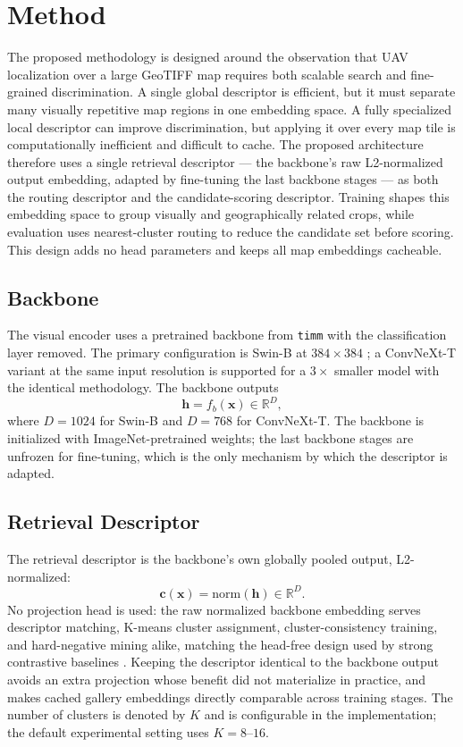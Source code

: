 \documentclass[conference]{IEEEtran}
\begin{document}
\section{Method}
The proposed methodology is designed around the observation that UAV
localization over a large GeoTIFF map requires both scalable search and
fine-grained discrimination. A single global descriptor is efficient, but it
must separate many visually repetitive map regions in one embedding space. A
fully specialized local descriptor can improve discrimination, but applying it
over every map tile is computationally inefficient and difficult to cache. The
proposed architecture therefore uses a single retrieval descriptor — the
backbone's raw L2-normalized output embedding, adapted by fine-tuning the
last backbone stages — as both
the routing descriptor and the candidate-scoring descriptor. Training shapes
this embedding space to group visually and geographically
related crops, while evaluation uses nearest-cluster routing to reduce the
candidate set before scoring. This design adds no head parameters and keeps
all map embeddings cacheable.

\subsection{Backbone}
The visual encoder uses a pretrained backbone from \texttt{timm}
with the classification layer removed. The primary configuration is Swin-B at
$384\times384$ \cite{liu2021swin}; a ConvNeXt-T variant at the same input
resolution is supported for a $3\times$ smaller model with the identical
methodology. The backbone outputs
\begin{equation}
    \mathbf{h}=f_b(\mathbf{x})\in\mathbb{R}^{D},
\end{equation}
where $D=1024$ for Swin-B and $D=768$ for ConvNeXt-T. The backbone is
initialized with ImageNet-pretrained weights; the last backbone stages are
unfrozen for fine-tuning, which is the only mechanism by which the descriptor
is adapted.

\subsection{Retrieval Descriptor}
The retrieval descriptor is the backbone's own globally pooled output,
L2-normalized:
\begin{equation}
    \mathbf{c}(\mathbf{x}) =
    \mathrm{norm}\left(\mathbf{h}\right)\in\mathbb{R}^{D}.
\end{equation}
No projection head is used: the raw normalized backbone embedding serves
descriptor matching, K-means cluster assignment, cluster-consistency
training, and hard-negative mining alike, matching the head-free design used
by strong contrastive baselines \cite{deuser2023sample4geo,ji2024game4loc}.
Keeping the descriptor identical to the backbone output avoids an extra
projection whose benefit did not materialize in practice, and makes cached
gallery embeddings directly comparable across training stages. The number of
clusters is denoted by $K$ and is configurable in the implementation; the
default experimental setting uses $K=8$--$16$.
\end{document}
